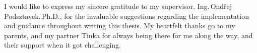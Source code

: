 \documentclass[english,bachelor,oneside]{ctufit-thesis}
\begin{document}
\frontmatter\frontmatterinit %

\thispagestyle{empty}\maketitle\thispagestyle{empty}\cleardoublepage %


\imprintpage %
\stopTOCentries

\begin{acknowledgmentpage}

    I would like to express my sincere gratitude to my supervisor, Ing.\,Ondřej Podsztavek,\,Ph.D., for the invaluable suggestions regarding the implementation and guidance throughout writing this thesis.
    My heartfelt thanks go to my parents, and my partner Tinka for always being there for me along the way, and their support when it got challenging.
\end{acknowledgmentpage}
\end{document}
